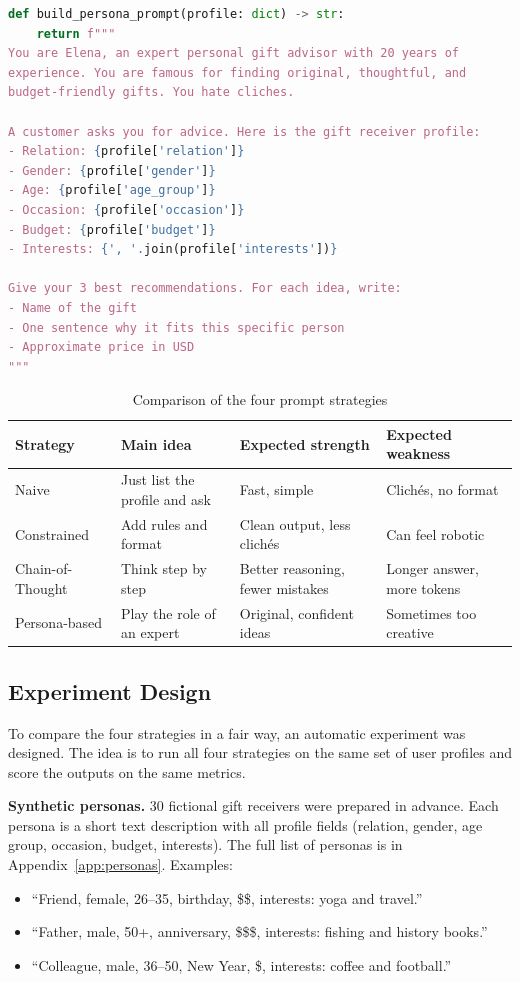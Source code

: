 \begin{lstlisting}[language=Python, caption={Persona-based prompt template.}, label={lst:persona}]
def build_persona_prompt(profile: dict) -> str:
    return f"""
You are Elena, an expert personal gift advisor with 20 years of
experience. You are famous for finding original, thoughtful, and
budget-friendly gifts. You hate cliches.

A customer asks you for advice. Here is the gift receiver profile:
- Relation: {profile['relation']}
- Gender: {profile['gender']}
- Age: {profile['age_group']}
- Occasion: {profile['occasion']}
- Budget: {profile['budget']}
- Interests: {', '.join(profile['interests'])}

Give your 3 best recommendations. For each idea, write:
- Name of the gift
- One sentence why it fits this specific person
- Approximate price in USD
"""
\end{lstlisting}

\begin{table}[H]
\centering
\caption{Comparison of the four prompt strategies}
\label{tab:strategies}
\begin{tabular}{p{2.5cm} p{3cm} p{4cm} p{4cm}}
\toprule
\textbf{Strategy} & \textbf{Main idea} & \textbf{Expected strength} & \textbf{Expected weakness} \\
\midrule
Naive & Just list the profile and ask & Fast, simple & Clich\'es, no format \\
Constrained & Add rules and format & Clean output, less clich\'es & Can feel robotic \\
Chain-of-Thought & Think step by step & Better reasoning, fewer mistakes & Longer answer, more tokens \\
Persona-based & Play the role of an expert & Original, confident ideas & Sometimes too creative \\
\bottomrule
\end{tabular}
\end{table}

\subsection{Experiment Design}
\label{sec:exp-design}

To compare the four strategies in a fair way, an automatic experiment was designed. The idea is to run all four strategies on the same set of user profiles and score the outputs on the same metrics.

\textbf{Synthetic personas.} 30 fictional gift receivers were prepared in advance. Each persona is a short text description with all profile fields (relation, gender, age group, occasion, budget, interests). The full list of personas is in Appendix~\ref{app:personas}. Examples:
\begin{itemize}
    \item ``Friend, female, 26--35, birthday, \$\$, interests: yoga and travel.''
    \item ``Father, male, 50+, anniversary, \$\$\$, interests: fishing and history books.''
    \item ``Colleague, male, 36--50, New Year, \$, interests: coffee and football.''
\end{itemize}

